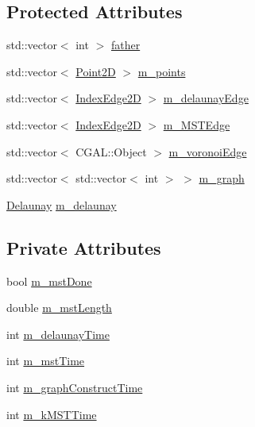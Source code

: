 \subsection*{Protected Attributes}
\begin{DoxyCompactItemize}
\item 
std\+::vector$<$ int $>$ \hyperlink{classcmst_1_1_graph2_d_ad5d251f2f6f8b827af4404985fcec53c}{father}
\item 
std\+::vector$<$ \hyperlink{classcmst_1_1_point2_d}{Point2D} $>$ \hyperlink{classcmst_1_1_graph2_d_a32456f3c630e34a56ce3109183142c10}{m\+\_\+points}
\item 
std\+::vector$<$ \hyperlink{classcmst_1_1_index_edge2_d}{Index\+Edge2D} $>$ \hyperlink{classcmst_1_1_graph2_d_a6fe64b2078ec3c700a8a2e2bd77e2dae}{m\+\_\+delaunay\+Edge}
\item 
std\+::vector$<$ \hyperlink{classcmst_1_1_index_edge2_d}{Index\+Edge2D} $>$ \hyperlink{classcmst_1_1_graph2_d_a1cc96b5251162964ac21f46955ac8271}{m\+\_\+\+M\+S\+T\+Edge}
\item 
std\+::vector$<$ C\+G\+A\+L\+::\+Object $>$ \hyperlink{classcmst_1_1_graph2_d_a05e5ea6746bfd9d0ccd47308f4bbf1af}{m\+\_\+voronoi\+Edge}
\item 
std\+::vector$<$ std\+::vector$<$ int $>$ $>$ \hyperlink{classcmst_1_1_graph2_d_a5df9c78edb4f5c68da11b01e44061dc5}{m\+\_\+graph}
\item 
\hyperlink{class_delaunay}{Delaunay} \hyperlink{classcmst_1_1_graph2_d_af19557df59901e6078c2038652c95623}{m\+\_\+delaunay}
\end{DoxyCompactItemize}
\subsection*{Private Attributes}
\begin{DoxyCompactItemize}
\item 
bool \hyperlink{classcmst_1_1_graph2_d_ab7c087fe87b5750195100ff25f10f628}{m\+\_\+mst\+Done}
\item 
double \hyperlink{classcmst_1_1_graph2_d_a722498b25b96d26e68e378ba970d5e65}{m\+\_\+mst\+Length}
\item 
int \hyperlink{classcmst_1_1_graph2_d_a869a2fef63a6dbc8733056afd9ad0b71}{m\+\_\+delaunay\+Time}
\item 
int \hyperlink{classcmst_1_1_graph2_d_a447f3d36666c57d2f15bddc1e3126f1e}{m\+\_\+mst\+Time}
\item 
int \hyperlink{classcmst_1_1_graph2_d_ac594da90a2c9bd7332644532969ef11f}{m\+\_\+graph\+Construct\+Time}
\item 
int \hyperlink{classcmst_1_1_graph2_d_a647ad467e7c301503a9ed46fd0eab494}{m\+\_\+k\+M\+S\+T\+Time}
\end{DoxyCompactItemize}


